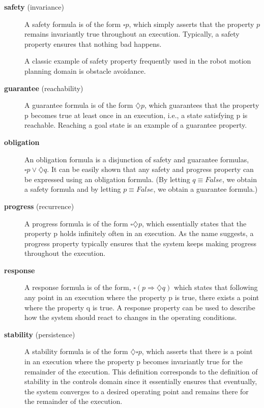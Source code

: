 \documentclass[10pt,letterpaper]{article}
\begin{document}
\begin{description}
	\item[\textbf{safety} (invariance)] A safety formula is of the form $\square p$, which simply asserts that the property $p$ remains invariantly true throughout an execution. Typically, a safety property ensures that nothing bad happens.
	
	A classic example of safety property frequently used in the robot motion planning domain is obstacle avoidance.
	
	\item[\textbf{guarantee} (reachability)] A guarantee formula is of the form $\diamondsuit p$, which guarantees that the property p becomes true at least once in an execution, i.e., a state satisfying p is reachable. Reaching a goal state is an example of a guarantee property.
	
	\item[\textbf{obligation} ] An obligation formula is a disjunction of safety and guarantee formulas, $\square p \lor \diamondsuit q$. It can be easily shown that any safety and progress property can be expressed using an obligation formula. (By letting $q \equiv False$, we obtain a safety formula and by letting $p \equiv False$, we obtain a guarantee formula.)

	\item[\textbf{progress} (recurrence)] A progress formula is of the form $\square \diamondsuit p$, which essentially states that the property p holds infinitely often in an execution. As the name suggests, a progress property typically ensures that the system keeps making progress throughout the execution.
	
	\item[ \textbf{response}] A response formula is of the form, $\square (p \Rightarrow \diamondsuit q)$ which states that following any point in an execution where the property p is true, there exists a point where the property q is true. A response property can be used to describe how the system should react to changes in the operating conditions.
	
	\item[\textbf{stability} (persistence)] A stability formula is of the form $\diamondsuit \square p$, which asserts that there is a point in an execution where the property p becomes invariantly true for the remainder of the execution. This definition corresponds to the definition of stability in the controls domain since it essentially ensures that eventually, the system converges to a desired operating point and remains there for the remainder of the execution.

\end{description}
\end{document}
